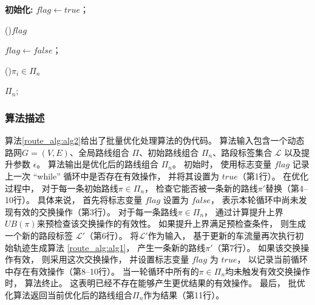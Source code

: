      \begin{algorithm}[htp]
        \caption{批量优化处理}
        \label{route_alg:alg2}


        \textbf{初始化:} $flag \leftarrow true$；

        \While(){$flag$}{
            $flag \leftarrow false$；

            \For(){$\pi_i \in \Pi_n$}{
            }
        }
        \Return $\Pi_n$;
        \end{algorithm}

	\subsubsection*{算法描述}
		算法\ref{route_alg:alg2}给出了批量优化处理算法的伪代码。 算法输入包含一个动态路网$G=(V,E)$、全局路线组合 $\Pi$、初始路线组合 $\Pi_n$、路段标签集合 $\mathcal{L}$ 以及提升参数 $\epsilon$。 算法输出是优化后的路线组合 $\Pi_n$。 初始时， 使用标志变量 $flag$ 记录上一次 ``while'' 循环中是否存在有效操作， 并将其设置为 $true$（第1行）。 在优化过程中， 对于每一条初始路线$\pi \in \Pi_n$， 检查它能否被一条新的路线$\pi'$替换（第4--10行）。 具体来说， 首先将标志变量 $flag$ 设置为 $false$， 表示本轮循环中尚未发现有效的交换操作（第3行）。 对于每一条路线$\pi \in \Pi_n$， 通过计算提升上界$UB(\pi)$来预检查该交换操作的有效性。 如果提升上界满足预检查条件， 则生成一个新的路段标签 $\mathcal{L}'$（第6行）。 将$\mathcal{L}'$作为输入， 基于更新的车流量再次执行初始轨迹生成算法 \ref{route_alg:alg1}， 产生一条新的路线$\pi'$（第7行）。 如果该交换操作有效， 则采用这次交换操作， 并设置标志变量 $flag$ 为 $true$， 以记录当前循环中存在有效操作（第8--10行）。 当一轮循环中所有的$\pi \in \Pi_n$均未触发有效交换操作时， 算法终止。 这表明已经不存在能够产生更优结果的有效操作。 最后， 批优化算法返回当前优化后的路线组合$\Pi_n$作为结果（第11行）。

